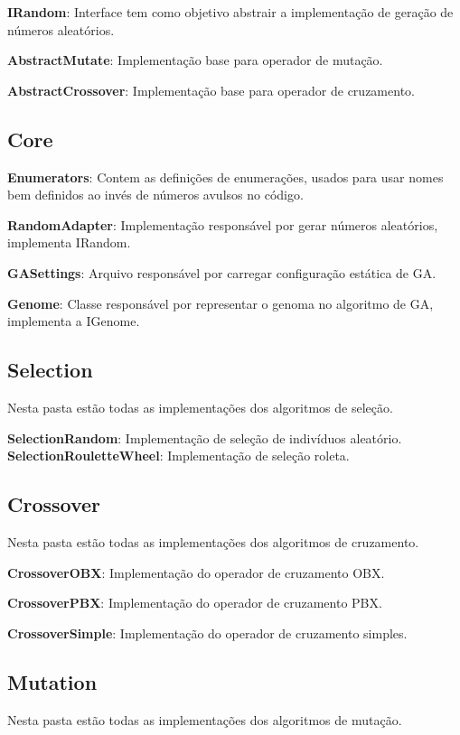 \textbf{IRandom}: Interface tem como objetivo abstrair a implementação de geração de números aleatórios.

\textbf{AbstractMutate}: Implementação base para operador de mutação.

\textbf{AbstractCrossover}: Implementação base para operador de cruzamento.

\subsection{Core}

\textbf{Enumerators}: Contem as definições de enumerações, usados para usar nomes bem definidos ao invés de números avulsos no código.

\textbf{RandomAdapter}: Implementação responsável por gerar números aleatórios, implementa IRandom.

\textbf{GASettings}: Arquivo responsável por carregar configuração estática de GA.

\textbf{Genome}: Classe responsável por representar o genoma no algoritmo de GA, implementa a IGenome.

\subsection{Selection}

Nesta pasta estão todas as implementações dos algoritmos de seleção.

\textbf{SelectionRandom}: Implementação de seleção de indivíduos aleatório.
\textbf{SelectionRouletteWheel}: Implementação de seleção roleta.

\subsection{Crossover}

Nesta pasta estão todas as implementações dos algoritmos de cruzamento.

\textbf{CrossoverOBX}: Implementação do operador de cruzamento OBX.

\textbf{CrossoverPBX}: Implementação do operador de cruzamento PBX.

\textbf{CrossoverSimple}:  Implementação do operador de cruzamento simples.

\subsection{Mutation}

Nesta pasta estão todas as implementações dos algoritmos de mutação.

